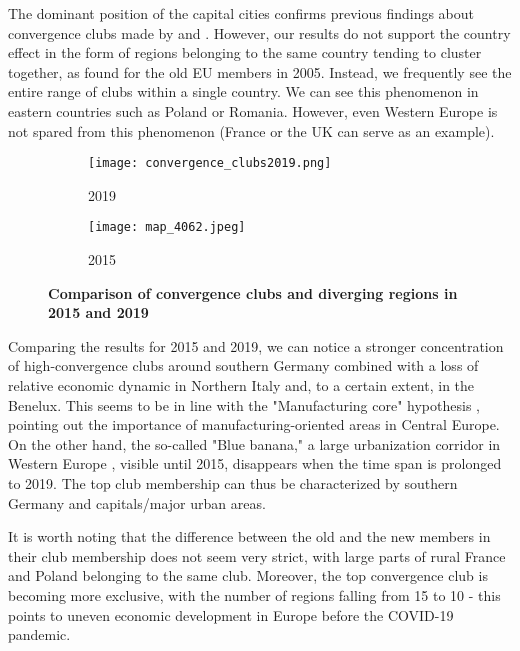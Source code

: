 \documentclass[11pt]{article}
\begin{document}
The dominant position of the capital cities confirms previous findings about convergence clubs made by \citet{sme2012regional} and \citet{bartkowska2012regional}. However, our results do not support the country effect in the form of regions belonging to the same country tending to cluster together, as \citet{bartkowska2012regional} found for the old EU members in 2005. Instead, we frequently see the entire range of clubs within a single country. We can see this phenomenon in eastern countries such as Poland or Romania. However,
even Western Europe is not spared from this phenomenon (France or the UK can serve as an example).


\begin{figure}[!htbp]%
\centering
\begin{subfigure}[c]{0.77\linewidth}
  {
  \texttt{[image: convergence\_clubs2019.png]}
    \caption{2019}
    \label{clubs_graphic_2019}
  }
\end{subfigure}
\qquad
\begin{subfigure}[c]{0.77\linewidth}
  \texttt{[image: map\_4062.jpeg]}
  \caption{2015}
  \label{clubs_graphic_2015}
\end{subfigure}
  \caption{\textbf{Comparison of convergence clubs and diverging regions in 2015 and 2019}}
\label{clubs_graphic}
\end{figure} 


Comparing the results for 2015 and 2019, we can notice a stronger concentration of high-convergence clubs around southern Germany combined with a loss of relative economic dynamic in Northern Italy and, to a certain extent, in the Benelux. This seems to be in line with the "Manufacturing core" hypothesis \citep{cutrini2019economic, stollinger2016structural}, pointing out the importance of manufacturing-oriented areas in Central Europe. On the other hand, the so-called "Blue banana," a large urbanization corridor in Western Europe \citep{hospers2002beyond}, visible until 2015, disappears when the time span is prolonged to 2019. The top club membership can thus be characterized by southern Germany and capitals/major urban areas.

It is worth noting that the difference between the old and the new members in their club membership does not seem very strict, with large parts of rural France and Poland belonging to the same club. Moreover, the top convergence club is becoming more exclusive, with the number of regions falling from 15 to 10 - this points to uneven economic development in Europe before the COVID-19 pandemic.
\end{document}
